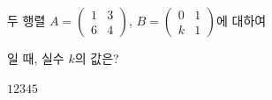 \hspace*{2mm}\begin{minipage}[t]{\dimexpr\linewidth-2mm\relax}\vspace{0pt}
두 행렬 $A=\begin{pmatrix} 1 & 3 \\ 6 & 4 \end{pmatrix}$, $B=\begin{pmatrix} 0 & 1 \\ k & 1 \end{pmatrix}$에 대하여 \par\smallskip{}\par\smallskip\noindent 일 때, 실수 $k$의 값은?
\begin{choices32}{$1$}{$2$}{$3$}{$4$}{$5$}\end{choices32}\end{minipage}
